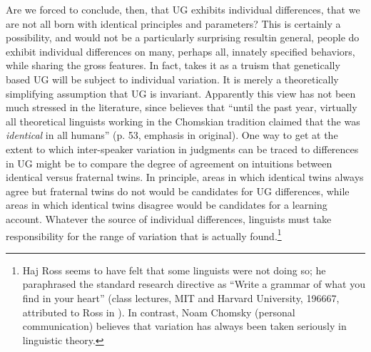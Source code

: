  Are we forced to conclude, then, that UG exhibits individual differences, that we are not all born with identical principles and parameters? This is certainly a possibility, and would not be a particularly surprising result\schdash{}in general, people do exhibit individual differences on many, perhaps all, innately specified behaviors, while sharing the gross features. In fact, \citet{Chomsky1991} takes it as a
 truism that genetically based UG will be subject to individual variation.  It is merely a theoretically simplifying assumption that UG is invariant. Apparently this view has not been much stressed in the literature, since \citet{Lieberman1991} believes that ``until the past year, virtually all theoretical linguists working in the Chomskian tradition claimed that the  was \textit{identical} in all humans'' (p. 53, emphasis in original). One way to get at the extent to which inter-speaker variation in judgments can be traced to differences in UG might be to compare the degree of agreement on intuitions between identical versus fraternal twins. In principle, areas in which identical twins always agree but fraternal twins do not would be candidates for UG differences, while areas in which identical twins disagree would be candidates for a learning account. Whatever the source of individual differences, linguists must take responsibility for the range of variation that is actually found.\footnote{Haj Ross seems to have felt that some linguists were not doing so; he paraphrased the standard research directive as ``Write a grammar of what you find in your heart'' (class lectures, MIT and Harvard University, 1966\textendash{}67, attributed to Ross in \citet{Carden1973}). In contrast, Noam Chomsky (personal communication) believes that variation has always been taken seriously in linguistic theory.}


